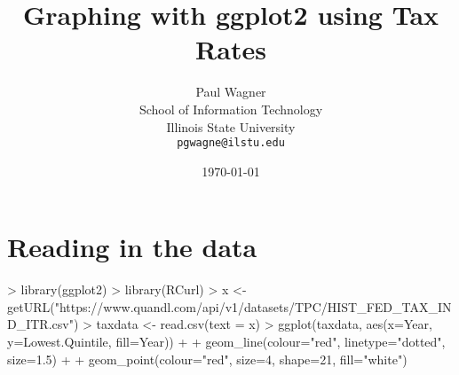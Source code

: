 \documentclass{article}
\begin{document}


\title { Graphing with ggplot2 using Tax Rates} 
\author { Paul Wagner  
\\ School of Information Technology 
\\ Illinois State University
\\
\texttt{pgwagne@ilstu.edu}}
\date{\today} 
\maketitle



\section{Reading in the data}


\begin{Schunk}
\begin{Sinput}
> library(ggplot2)
> library(RCurl)
> x <- getURL("https://www.quandl.com/api/v1/datasets/TPC/HIST_FED_TAX_IND_ITR.csv")
> taxdata <- read.csv(text = x)
> ggplot(taxdata, aes(x=Year, y=Lowest.Quintile, fill=Year)) + 
+     geom_line(colour="red", linetype="dotted", size=1.5) + 
+     geom_point(colour="red", size=4, shape=21, fill="white")
\end{Sinput}
\end{Schunk}
\end{document}

